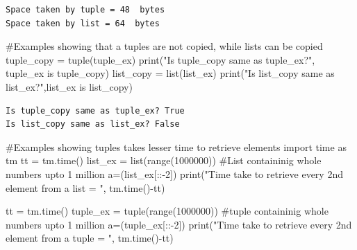 \documentclass[
  letterpaper,
  DIV=11,
  numbers=noendperiod]{scrreprt}
\newenvironment{Shaded}{\begin{snugshade}}{\end{snugshade}}
\newcommand{\BuiltInTok}[1]{\textcolor[rgb]{0.00,0.23,0.31}{#1}}
\newcommand{\CommentTok}[1]{\textcolor[rgb]{0.37,0.37,0.37}{#1}}
\newcommand{\DecValTok}[1]{\textcolor[rgb]{0.68,0.00,0.00}{#1}}
\newcommand{\ImportTok}[1]{\textcolor[rgb]{0.00,0.46,0.62}{#1}}
\newcommand{\KeywordTok}[1]{\textcolor[rgb]{0.00,0.23,0.31}{#1}}
\newcommand{\NormalTok}[1]{\textcolor[rgb]{0.00,0.23,0.31}{#1}}
\newcommand{\OperatorTok}[1]{\textcolor[rgb]{0.37,0.37,0.37}{#1}}
\newcommand{\StringTok}[1]{\textcolor[rgb]{0.13,0.47,0.30}{#1}}
\begin{document}
\begin{verbatim}
Space taken by tuple = 48  bytes
Space taken by list = 64  bytes
\end{verbatim}

\begin{Shaded}
\begin{Highlighting}[]
\CommentTok{\#Examples showing that a tuples are not copied, while lists can be copied}
\NormalTok{tuple\_copy }\OperatorTok{=} \BuiltInTok{tuple}\NormalTok{(tuple\_ex)}
\BuiltInTok{print}\NormalTok{(}\StringTok{"Is tuple\_copy same as tuple\_ex?"}\NormalTok{, tuple\_ex }\KeywordTok{is}\NormalTok{ tuple\_copy)}
\NormalTok{list\_copy }\OperatorTok{=} \BuiltInTok{list}\NormalTok{(list\_ex)}
\BuiltInTok{print}\NormalTok{(}\StringTok{"Is list\_copy same as list\_ex?"}\NormalTok{,list\_ex }\KeywordTok{is}\NormalTok{ list\_copy)}
\end{Highlighting}
\end{Shaded}

\begin{verbatim}
Is tuple_copy same as tuple_ex? True
Is list_copy same as list_ex? False
\end{verbatim}

\begin{Shaded}
\begin{Highlighting}[]
\CommentTok{\#Examples showing tuples takes lesser time to retrieve elements}
\ImportTok{import}\NormalTok{ time }\ImportTok{as}\NormalTok{ tm}
\NormalTok{tt }\OperatorTok{=}\NormalTok{ tm.time()}
\NormalTok{list\_ex }\OperatorTok{=} \BuiltInTok{list}\NormalTok{(}\BuiltInTok{range}\NormalTok{(}\DecValTok{1000000}\NormalTok{)) }\CommentTok{\#List containinig whole numbers upto 1 million}
\NormalTok{a}\OperatorTok{=}\NormalTok{(list\_ex[::}\OperatorTok{{-}}\DecValTok{2}\NormalTok{])}
\BuiltInTok{print}\NormalTok{(}\StringTok{"Time take to retrieve every 2nd element from a list = "}\NormalTok{, tm.time()}\OperatorTok{{-}}\NormalTok{tt)}

\NormalTok{tt }\OperatorTok{=}\NormalTok{ tm.time()}
\NormalTok{tuple\_ex }\OperatorTok{=} \BuiltInTok{tuple}\NormalTok{(}\BuiltInTok{range}\NormalTok{(}\DecValTok{1000000}\NormalTok{)) }\CommentTok{\#tuple containinig whole numbers upto 1 million}
\NormalTok{a}\OperatorTok{=}\NormalTok{(tuple\_ex[::}\OperatorTok{{-}}\DecValTok{2}\NormalTok{])}
\BuiltInTok{print}\NormalTok{(}\StringTok{"Time take to retrieve every 2nd element from a tuple = "}\NormalTok{, tm.time()}\OperatorTok{{-}}\NormalTok{tt)}
\end{Highlighting}
\end{Shaded}
\end{document}
